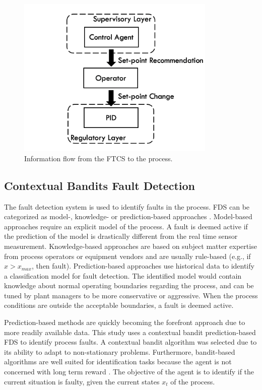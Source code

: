 \begin{figure}[H]
    \begin{center}
        \includegraphics[width=9.5cm]{images/ftc/ftc_pid_setup.png}
        \caption{\label{fig:ftc_pid_setup} Information flow from the FTCS to the process.}
    \end{center}
\end{figure}
\subsection{Contextual Bandits Fault Detection}
The fault detection system is used to identify faults in the process.  FDS can be categorized as model-, knowledge- or prediction-based approaches \cite{ftcs_diagnosis_ref7}. Model-based approaches require an explicit model of the process.  A fault is deemed active if the prediction of the model is drastically different from the real time sensor measurement.  Knowledge-based approaches are based on subject matter expertise from process operators or equipment vendors and are usually rule-based (e.g., if $x > x_{max}$, then fault). Prediction-based approaches use historical data to identify a classification model for fault detection. The identified model would contain knowledge about normal operating boundaries regarding the process, and can be tuned by plant managers to be more conservative or aggressive. When the process conditions are outside the acceptable boundaries, a fault is deemed active. 

Prediction-based methods are quickly becoming the forefront approach due to more readily available data. This study uses a contextual bandit prediction-based FDS to identify process faults. A contextual bandit algorithm was selected due to its ability to adapt to non-stationary problems.  Furthermore, bandit-based algorithms are well suited for identification tasks because the agent is not concerned with long term reward \cite{sutton}. The objective of the agent is to identify if the current situation is faulty, given the current states $x_t$ of the process. 

